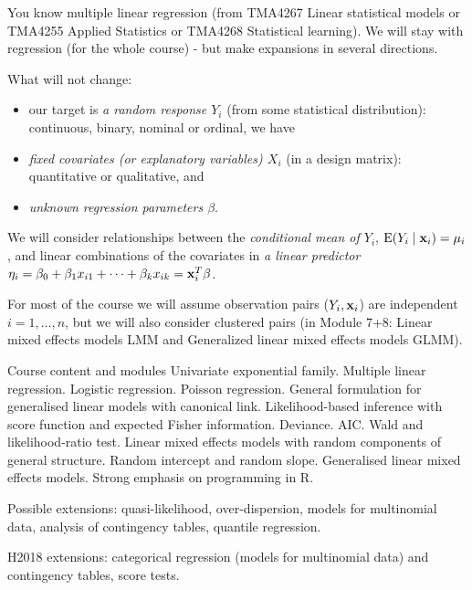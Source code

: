 \documentclass[
  ignorenonframetext,
]{beamer}
\begin{document}
\begin{frame}
You know multiple linear regression (from TMA4267 Linear statistical
models or TMA4255 Applied Statistics or TMA4268 Statistical learning).
We will stay with regression (for the whole course) - but make
expansions in several directions.

What will not change:

\begin{itemize}
\item
  our target is \emph{a random response \(Y_i\)} (from some statistical
  distribution): continuous, binary, nominal or ordinal, we have
\item
  \emph{fixed covariates (or explanatory variables) \(X_i\)} (in a
  design matrix): quantitative or qualitative, and
\item
  \emph{unknown regression parameters \(\beta\)}.
\end{itemize}

We will consider relationships between the \emph{conditional mean of
\(Y_i\)}, \(\text{E}(Y_i\mid {\bf x}_i)=\mu_i\), and linear combinations
of the covariates in \emph{a linear predictor}
\(\eta_i=\beta_0+\beta_1 x_{i1}+\cdots +\beta_k x_{ik}={\bf x}_i^T {\bf \beta}\).

For most of the course we will assume observation pairs
(\(Y_i,{\bf x}_i\)) are independent \(i=1,\ldots,n\), but we will also
consider clustered pairs (in Module 7+8: Linear mixed effects models LMM
and Generalized linear mixed effects models GLMM).
\end{frame}

\begin{frame}{Course content and modules}
\protect\hypertarget{course-content-and-modules}{}
Univariate exponential family. Multiple linear regression. Logistic
regression. Poisson regression. General formulation for generalised
linear models with canonical link. Likelihood-based inference with score
function and expected Fisher information. Deviance. AIC. Wald and
likelihood-ratio test. Linear mixed effects models with random
components of general structure. Random intercept and random slope.
Generalised linear mixed effects models. Strong emphasis on programming
in R.

Possible extensions: quasi-likelihood, over-dispersion, models for
multinomial data, analysis of contingency tables, quantile regression.

H2018 extensions: categorical regression (models for multinomial data)
and contingency tables, score tests.
\end{frame}
\end{document}
